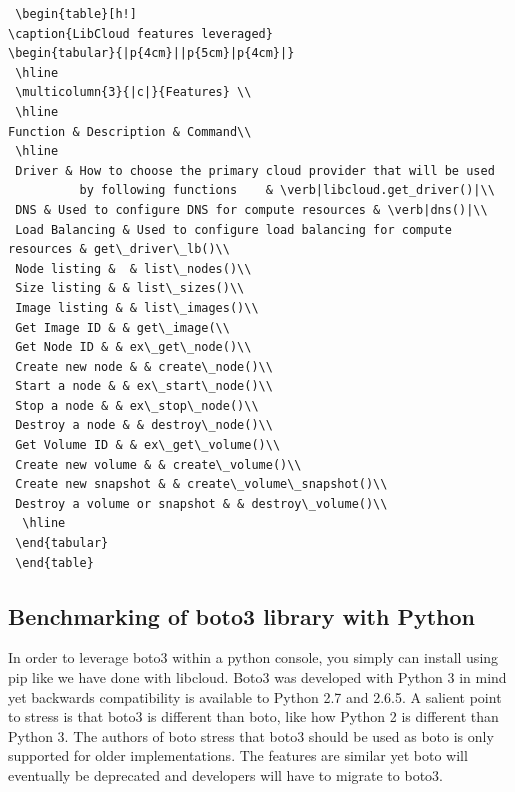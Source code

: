 \begin{verbatim}
 \begin{table}[h!]
\caption{LibCloud features leveraged}
\begin{tabular}{|p{4cm}||p{5cm}|p{4cm}|}
 \hline
 \multicolumn{3}{|c|}{Features} \\
 \hline
Function & Description & Command\\
 \hline
 Driver	& How to choose the primary cloud provider that will be used
          by following functions	& \verb|libcloud.get_driver()|\\
 DNS & Used to configure DNS for compute resources & \verb|dns()|\\
 Load Balancing & Used to configure load balancing for compute resources & get\_driver\_lb()\\
 Node listing &  & list\_nodes()\\
 Size listing & & list\_sizes()\\
 Image listing & & list\_images()\\
 Get Image ID & & get\_image(\\
 Get Node ID & & ex\_get\_node()\\
 Create new node & & create\_node()\\
 Start a node & & ex\_start\_node()\\
 Stop a node & & ex\_stop\_node()\\
 Destroy a node & & destroy\_node()\\
 Get Volume ID & & ex\_get\_volume()\\
 Create new volume & & create\_volume()\\
 Create new snapshot & & create\_volume\_snapshot()\\
 Destroy a volume or snapshot & & destroy\_volume()\\
  \hline
 \end{tabular}
 \end{table}

\end{verbatim}




 
\subsection{Benchmarking of boto3 library with Python}

In order to leverage boto3 within a python console, you simply can install using
pip like we have done with libcloud. Boto3 was developed with Python 3 in mind
yet backwards compatibility is available to Python 2.7 and 2.6.5. A salient
point to stress is that boto3 is different than boto, like how Python 2 is
different than Python 3. The authors of boto stress that boto3 should be used as
boto is only supported for older implementations. The features are similar yet
boto will eventually be deprecated and developers will have to migrate to
boto3.~\cite{hid-sp18-518-AWS-boto3}

